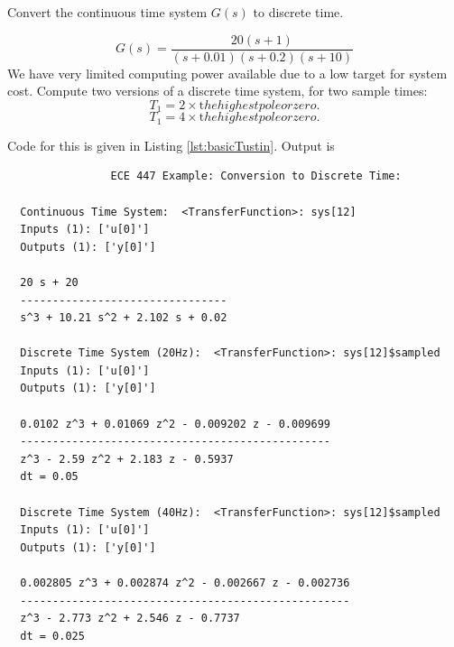 \begin{Example}
Convert the continuous time system $G(s)$ to discrete time.

 \[
 G(s) = \frac {20(s+1)}  {(s+0.01)(s+0.2)(s+10)}
 \]
We have very limited computing power available due to a low target for system cost.
Compute two versions of a discrete time system, for two sample times:
\[
T_1 = 2\times {\mathrm the highest pole or zero.}
\]
\[
T_1 = 4\times {\mathrm the highest pole or zero.}
\]

Code for this is given in Listing \ref{lst:basicTustin}.   Output is
\begin{verbatim}
                ECE 447 Example: Conversion to Discrete Time:

  Continuous Time System:  <TransferFunction>: sys[12]
  Inputs (1): ['u[0]']
  Outputs (1): ['y[0]']

  20 s + 20
  --------------------------------
  s^3 + 10.21 s^2 + 2.102 s + 0.02

  Discrete Time System (20Hz):  <TransferFunction>: sys[12]$sampled
  Inputs (1): ['u[0]']
  Outputs (1): ['y[0]']

  0.0102 z^3 + 0.01069 z^2 - 0.009202 z - 0.009699
  ------------------------------------------------
  z^3 - 2.59 z^2 + 2.183 z - 0.5937
  dt = 0.05

  Discrete Time System (40Hz):  <TransferFunction>: sys[12]$sampled
  Inputs (1): ['u[0]']
  Outputs (1): ['y[0]']

  0.002805 z^3 + 0.002874 z^2 - 0.002667 z - 0.002736
  ---------------------------------------------------
  z^3 - 2.773 z^2 + 2.546 z - 0.7737
  dt = 0.025
\end{verbatim}
\end{Example}



%

